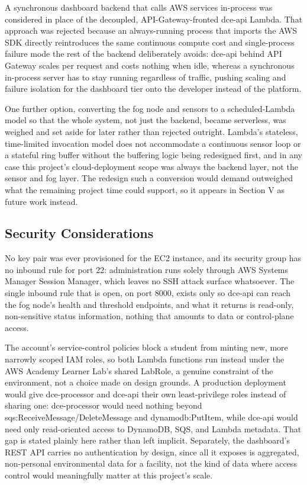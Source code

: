 \documentclass[conference]{IEEEtran}
\begin{document}
A synchronous dashboard backend that calls AWS services in-process was considered in place of the decoupled, API-Gateway-fronted dce-api Lambda. That approach was rejected because an always-running process that imports the AWS SDK directly reintroduces the same continuous compute cost and single-process failure mode the rest of the backend deliberately avoids: dce-api behind API Gateway scales per request and costs nothing when idle, whereas a synchronous in-process server has to stay running regardless of traffic, pushing scaling and failure isolation for the dashboard tier onto the developer instead of the platform.

One further option, converting the fog node and sensors to a scheduled-Lambda model so that the whole system, not just the backend, became serverless, was weighed and set aside for later rather than rejected outright. Lambda's stateless, time-limited invocation model does not accommodate a continuous sensor loop or a stateful ring buffer without the buffering logic being redesigned first, and in any case this project's cloud-deployment scope was always the backend layer, not the sensor and fog layer. The redesign such a conversion would demand outweighed what the remaining project time could support, so it appears in Section V as future work instead.

\subsection{Security Considerations}
No key pair was ever provisioned for the EC2 instance, and its security group has no inbound rule for port 22: administration runs solely through AWS Systems Manager Session Manager, which leaves no SSH attack surface whatsoever. The single inbound rule that is open, on port 8000, exists only so dce-api can reach the fog node's health and threshold endpoints, and what it returns is read-only, non-sensitive status information, nothing that amounts to data or control-plane access.

The account's service-control policies block a student from minting new, more narrowly scoped IAM roles, so both Lambda functions run instead under the AWS Academy Learner Lab's shared LabRole, a genuine constraint of the environment, not a choice made on design grounds. A production deployment would give dce-processor and dce-api their own least-privilege roles instead of sharing one: dce-processor would need nothing beyond sqs:ReceiveMessage/DeleteMessage and dynamodb:PutItem, while dce-api would need only read-oriented access to DynamoDB, SQS, and Lambda metadata. That gap is stated plainly here rather than left implicit. Separately, the dashboard's REST API carries no authentication by design, since all it exposes is aggregated, non-personal environmental data for a facility, not the kind of data where access control would meaningfully matter at this project's scale.
\end{document}
